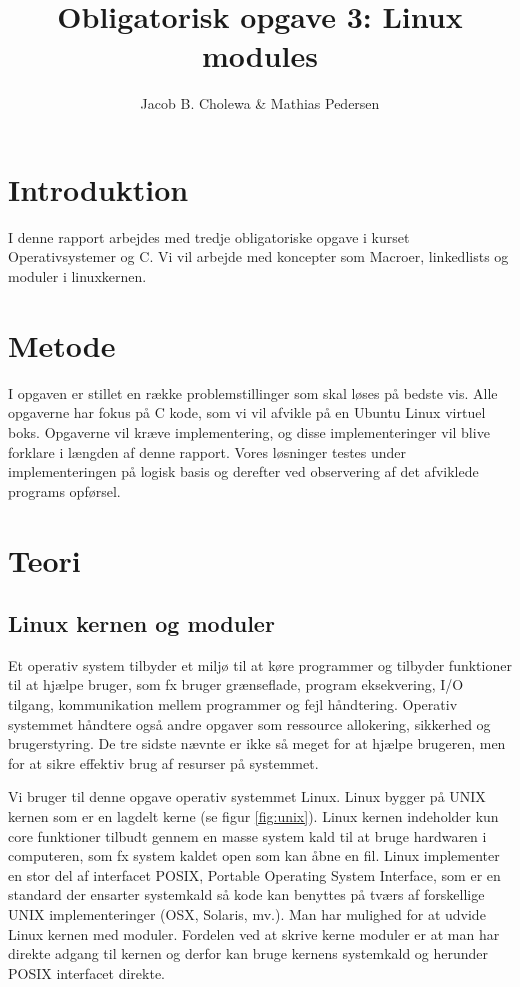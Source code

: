 \documentclass[danish]{report}
\title{Obligatorisk opgave 3: Linux modules}
\author{Jacob B. Cholewa \& Mathias Pedersen }
\begin{document}
\maketitle
\begingroup
\let\clearpage\relax
\chapter{Introduktion}
I denne rapport arbejdes med tredje obligatoriske opgave i kurset Operativsystemer og C. Vi vil arbejde med koncepter som Macroer, linkedlists og moduler i linuxkernen.

\vspace{20 mm}\chapter{Metode}
I opgaven er stillet en række problemstillinger som skal løses på bedste vis. Alle opgaverne har fokus på C kode, som vi vil afvikle på en Ubuntu Linux virtuel boks. Opgaverne vil kræve implementering, og disse implementeringer vil blive forklare i længden af denne rapport. Vores løsninger testes under implementeringen på logisk basis og derefter ved observering af det afviklede programs opførsel.
\endgroup
\chapter{Teori}
\section{Linux kernen og moduler}

Et operativ system tilbyder et miljø til at køre programmer og tilbyder funktioner til at hjælpe bruger, som fx bruger grænseflade, program eksekvering, I/O tilgang, kommunikation mellem programmer og fejl håndtering. Operativ systemmet håndtere også andre opgaver som ressource allokering, sikkerhed og brugerstyring. De tre sidste nævnte er ikke så meget for at hjælpe brugeren, men for at sikre effektiv brug af resurser på systemmet.

Vi bruger til denne opgave operativ systemmet Linux. Linux bygger på UNIX kernen som er en lagdelt kerne (se figur \ref{fig:unix}). Linux kernen indeholder kun core funktioner tilbudt gennem en masse system kald til at bruge hardwaren i computeren, som fx system kaldet open som kan åbne en fil. Linux implementer en stor del af interfacet POSIX, Portable Operating System Interface, som er en standard der ensarter systemkald så kode kan benyttes på tværs af forskellige UNIX implementeringer (OSX, Solaris, mv.). Man har mulighed for at udvide Linux kernen med moduler. Fordelen ved at skrive kerne moduler er at man har direkte adgang til kernen og derfor kan bruge kernens systemkald og herunder POSIX interfacet direkte.
\end{document}

